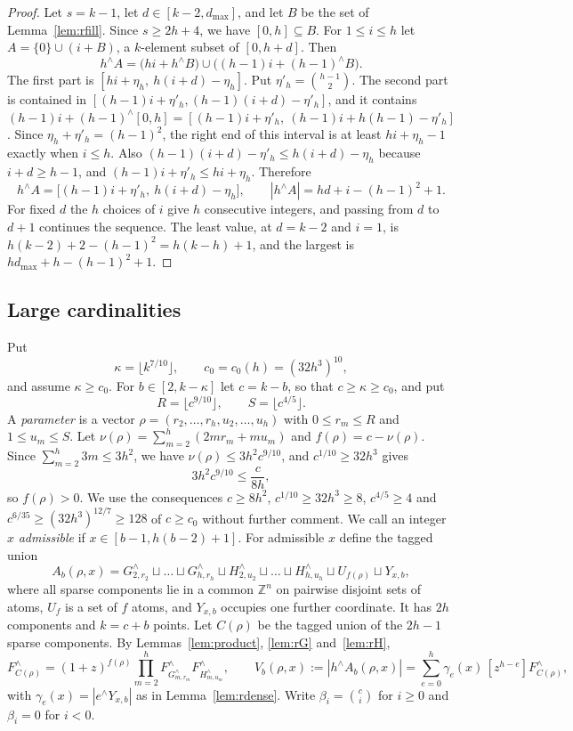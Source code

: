 \documentclass[11pt]{amsart}
\theoremstyle{definition}
\theoremstyle{remark}
\numberwithin{equation}{section}
\newcommand{\Z}{\mathbb{Z}}
\newcommand{\res}[2]{#1^{\wedge}#2}
\newcommand{\Fr}{F^{\wedge}}
\newcommand{\coef}[1]{[z^{#1}]}
\begin{document}
\begin{proof}
Let $s=k-1$, let $d\in[k-2,d_{\max}]$, and let $B$ be the set of Lemma~\ref{lem:rfill}. Since $s\ge 2h+4$, we have $[0,h]\subseteq B$. For $1\le i\le h$ let $A=\{0\}\cup(i+B)$, a $k$-element subset of $[0,h+d]$. Then
\[
\res hA=\bigl(hi+\res hB\bigr)\cup\bigl((h-1)i+\res{(h-1)}B\bigr).
\]
The first part is $[hi+\eta_h,\ h(i+d)-\eta_h]$. Put $\eta'_h=\binom{h-1}2$. The second part is contained in $[(h-1)i+\eta'_h,(h-1)(i+d)-\eta'_h]$, and it contains $(h-1)i+\res{(h-1)}{[0,h]}=[(h-1)i+\eta'_h,\ (h-1)i+h(h-1)-\eta'_h]$. Since $\eta_h+\eta'_h=(h-1)^2$, the right end of this interval is at least $hi+\eta_h-1$ exactly when $i\le h$. Also $(h-1)(i+d)-\eta'_h\le h(i+d)-\eta_h$ because $i+d\ge h-1$, and $(h-1)i+\eta'_h\le hi+\eta_h$. Therefore
\[
\res hA=\bigl[(h-1)i+\eta'_h,\ h(i+d)-\eta_h\bigr],\qquad |\res hA|=hd+i-(h-1)^2+1.
\]
For fixed $d$ the $h$ choices of $i$ give $h$ consecutive integers, and passing from $d$ to $d+1$ continues the sequence. The least value, at $d=k-2$ and $i=1$, is $h(k-2)+2-(h-1)^2=h(k-h)+1$, and the largest is $hd_{\max}+h-(h-1)^2+1$.
\end{proof}

\subsection{Large cardinalities}\label{sec:rlarge}

Put
\[
\kappa=\lfloor k^{7/10}\rfloor,\qquad c_0=c_0(h)=(32h^3)^{10},
\]
and assume $\kappa\ge c_0$. For $b\in[2,k-\kappa]$ let $c=k-b$, so that $c\ge\kappa\ge c_0$, and put
\[
R=\lfloor c^{9/10}\rfloor,\qquad S=\lfloor c^{4/5}\rfloor.
\]
A \emph{parameter} is a vector $\rho=(r_2,\dots,r_h,u_2,\dots,u_h)$ with $0\le r_m\le R$ and $1\le u_m\le S$. Let $\nu(\rho)=\sum_{m=2}^h(2mr_m+mu_m)$ and $f(\rho)=c-\nu(\rho)$. Since $\sum_{m=2}^h3m\le 3h^2$, we have $\nu(\rho)\le 3h^2c^{9/10}$, and $c^{1/10}\ge 32h^3$ gives
\begin{equation}\label{eq:rnonfree}
3h^2c^{9/10}\le\frac{c}{8h},
\end{equation}
so $f(\rho)>0$. We use the consequences $c\ge 8h^2$, $c^{1/10}\ge 32h^3\ge 8$, $c^{4/5}\ge 4$ and $c^{6/35}\ge(32h^3)^{12/7}\ge 128$ of $c\ge c_0$ without further comment. We call an integer $x$ \emph{admissible} if $x\in[b-1,h(b-2)+1]$. For admissible $x$ define the tagged union
\[
A_b(\rho,x)=G^\wedge_{2,r_2}\sqcup\dots\sqcup G^\wedge_{h,r_h}\sqcup H^\wedge_{2,u_2}\sqcup\dots\sqcup H^\wedge_{h,u_h}\sqcup U_{f(\rho)}\sqcup Y_{x,b},
\]
where all sparse components lie in a common $\Z^n$ on pairwise disjoint sets of atoms, $U_f$ is a set of $f$ atoms, and $Y_{x,b}$ occupies one further coordinate. It has $2h$ components and $k=c+b$ points. Let $C(\rho)$ be the tagged union of the $2h-1$ sparse components. By Lemmas~\ref{lem:product}, \ref{lem:rG} and~\ref{lem:rH},
\[
\Fr_{C(\rho)}=(1+z)^{f(\rho)}\prod_{m=2}^h\Fr_{G^\wedge_{m,r_m}}\Fr_{H^\wedge_{m,u_m}},\qquad
V_b(\rho,x):=|\res hA_b(\rho,x)|=\sum_{e=0}^h\gamma_e(x)\,\coef{h-e}\Fr_{C(\rho)},
\]
with $\gamma_e(x)=|\res eY_{x,b}|$ as in Lemma~\ref{lem:rdense}. Write $\beta_i=\binom ci$ for $i\ge 0$ and $\beta_i=0$ for $i<0$.
\end{document}
